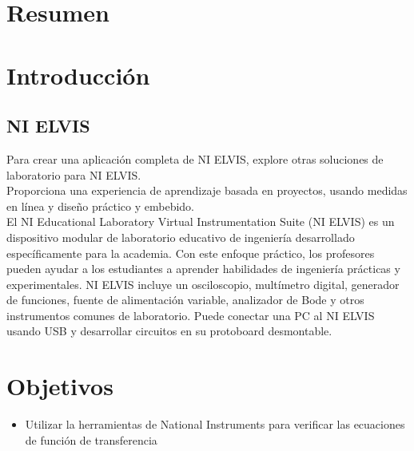\documentclass[]{article}
\begin{document}
	


\tableofcontents  %


\section{Resumen}

\section{Introducción}


\subsection{NI ELVIS}

Para crear una aplicación completa de NI ELVIS, explore otras soluciones de laboratorio para NI ELVIS.\\

Proporciona una experiencia de aprendizaje basada en proyectos, usando medidas en línea y diseño práctico y embebido.\\

El NI Educational Laboratory Virtual Instrumentation Suite (NI ELVIS) es un dispositivo modular de laboratorio educativo de ingeniería desarrollado específicamente para la academia. Con este enfoque práctico, los profesores pueden ayudar a los estudiantes a aprender habilidades de ingeniería prácticas y experimentales. NI ELVIS incluye un osciloscopio, multímetro digital, generador de funciones, fuente de alimentación variable, analizador de Bode y otros instrumentos comunes de laboratorio. Puede conectar una PC al NI ELVIS usando USB y desarrollar circuitos en su protoboard desmontable.\cite{NationalInstruments2018}\\


\section{Objetivos}

	\begin{itemize}
			\item Utilizar la herramientas de National Instruments para verificar las ecuaciones de función de transferencia
	\end{itemize}
\end{document}
